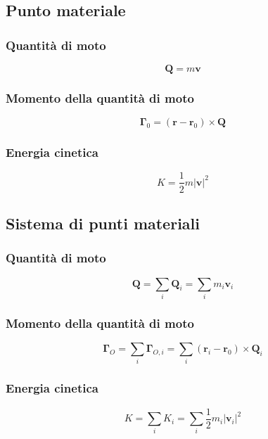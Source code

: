 \subsection{Punto materiale}
\subsubsection{Quantità di moto}
\begin{equation}
  \mathbf{Q} = m \mathbf{v}
\end{equation}
\subsubsection{Momento della quantità di moto}
\begin{equation}
    \mathbf{\Gamma}_0 = \left(\mathbf{r} - \mathbf{r}_0 \right) \times \mathbf{Q}
\end{equation}
\subsubsection{Energia cinetica}
\begin{equation}
    K = \dfrac{1}{2} m | \mathbf{v} |^2
\end{equation}

\subsection{Sistema di punti materiali}
\subsubsection{Quantità di moto}
\begin{equation}
    \mathbf{Q} = \sum_{i} \mathbf{Q}_i = \sum_i m_i \mathbf{v}_i
\end{equation}
\subsubsection{Momento della quantità di moto}
\begin{equation}
    \mathbf{\Gamma}_O = \sum_{i} \mathbf{\Gamma}_{O,i} = \sum_i \left( \mathbf{r}_i - \mathbf{r}_0 \right) \times \mathbf{Q}_i
\end{equation}
\subsubsection{Energia cinetica}
\begin{equation}
    K = \sum_i K_i = \sum_i \dfrac{1}{2} m_i | \mathbf{v}_i |^2
\end{equation}

